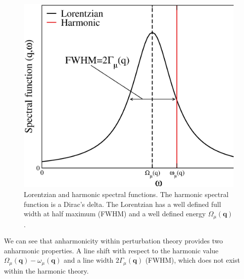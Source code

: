 \begin{figure}[h]
\begin{center}
\includegraphics[width=0.9\linewidth]{Figures/ins-toy1.eps}
\caption[Lorentzian and harmonic spectral functions]{Lorentzian and harmonic spectral functions. The harmonic spectral function is a Dirac's delta. The Lorentzian has a well defined full width at half maximum (FWHM) and a well defined energy $\Omega_{\mu}(\boldsymbol{q})$.}
\label{instoy}
\end{center}
\end{figure}
We can see that anharmonicity within perturbation theory provides two anharmonic properties. A line shift with respect to the harmonic value $\Omega_{\mu}(\mathbf{q})-\omega_{\mu}(\mathbf{q})$ and a line width $2\Gamma_{\mu}(\mathbf{q})$ (FWHM), which does not exist within the harmonic theory. \\

